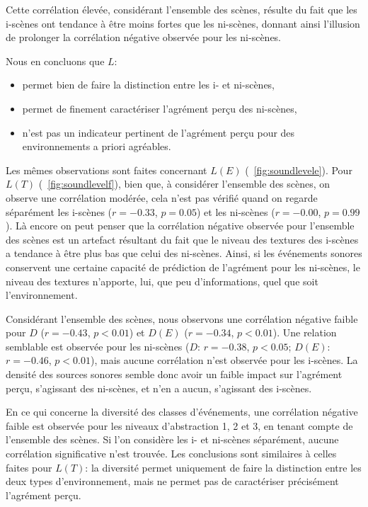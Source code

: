 Cette corrélation élevée, considérant l'ensemble des scènes, résulte du fait que les i-scènes ont tendance à être moins fortes que les ni-scènes, donnant ainsi l'illusion de prolonger la corrélation négative observée pour les ni-scènes.  

Nous en concluons que $L$:

\begin{itemize}
\item permet bien de faire la distinction entre les i- et ni-scènes,
\item permet de finement caractériser l'agrément perçu des ni-scènes,
\item n'est pas un indicateur pertinent de l'agrément perçu pour des environnements a priori agréables.
\end{itemize}

Les mêmes observations sont faites concernant $L(E)$ (\cf~\ref{fig:soundlevele}). Pour $L(T)$ (\cf~\ref{fig:soundlevelf}), bien que, à considérer l'ensemble des scènes, on observe une corrélation modérée, cela n'est pas vérifié quand on regarde séparément les i-scènes ($r=-0.33$, $p=0.05$) et les ni-scènes ($r=-0.00$, $p=0.99$). Là encore on peut penser que la corrélation négative observée pour l'ensemble des scènes est un artefact résultant du fait que le niveau des textures des i-scènes a tendance à être plus bas que celui des ni-scènes. Ainsi, si les événements sonores conservent une certaine capacité de prédiction de l'agrément pour les ni-scènes, le niveau des textures n'apporte, lui, que peu d'informations, quel que soit l'environnement.

Considérant l'ensemble des scènes, nous observons une corrélation négative faible pour $D$ ($r=-0.43$, $p<0.01$) et $D(E)$ ($r=-0.34$, $p<0.01$). Une relation semblable est observée pour les ni-scènes ($D$: $r=-0.38$, $p<0.05$; $D(E)$: $r=-0.46$, $p<0.01$), mais aucune corrélation n'est observée pour les i-scènes. La densité des sources sonores semble donc avoir un faible impact sur l'agrément perçu, s'agissant des ni-scènes, et n'en a aucun, s'agissant des i-scènes.

En ce qui concerne la diversité des classes d'événements, une corrélation négative faible est observée pour les niveaux d'abstraction 1, 2 et 3, en tenant compte de l'ensemble des scènes. Si l'on considère les i- et ni-scènes séparément, aucune corrélation significative n'est trouvée. Les conclusions sont similaires à celles faites pour $L(T)$: la diversité permet uniquement de faire la distinction entre les deux types d'environnement, mais ne permet pas de caractériser précisément l'agrément perçu.

